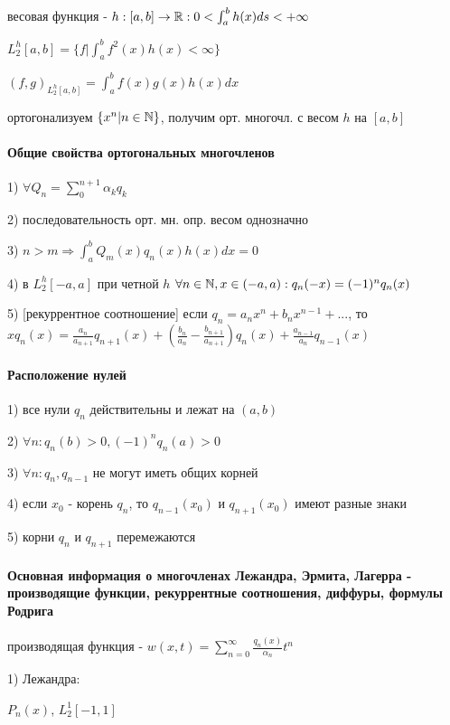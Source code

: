 \documentclass[russian,twocolumn]{article}
\begin{document}
весовая функция - $h:[a,b]\to \Bbb R : 0 < \int_a^b h(x)ds < +\infty$ 

$L_2^h[a,b]=\{f|\int_a^b f^2(x)h(x) < \infty\}$

$(f,g)_{L_2^h[a,b]}=\int_a^b f(x)g(x)h(x)dx$

ортогонализуем $\{x^n | n \in \Bbb N\}$, получим орт. многочл. с весом $h$ на $[a,b]$

\paragraph{Общие свойства ортогональных многочленов}

1) $\forall Q_n = \sum_0^{n+1} \alpha_k q_k$

2) последовательность орт. мн. опр. весом однозначно

3) $n > m \Rightarrow \int _a^b Q_m(x) q_n(x) h(x) dx = 0$

4) в $L_2^h[-a,a]$ при четной $h$ $\forall n \in \Bbb N,x\in(-a,a):q_n(-x)=(-1)^n q_n(x)$

5) [рекуррентное соотношение] если $q_n = a_n x^n + b_n x^{n-1} + ...$, то $x q_n(x) = \frac{a_n}{a_{n+1}}q_{n+1}(x)+(\frac{b_n}{a_n} - \frac{b_{n+1}}{a_{n+1}}) q_n(x) + \frac{a_{n-1}}{a_n}q_{n-1}(x)$

\paragraph{Расположение нулей}

1) все нули $q_n$ действительны и лежат на $(a,b)$

2) $\forall n : q_n(b) > 0, (-1)^n q_n(a) > 0$

3) $\forall n : q_n, q_{n-1}$ не могут иметь общих корней

4) если $x_0$ - корень $q_n$, то $q_{n-1}(x_0)$ и $q_{n+1}(x_0)$ имеют разные знаки

5) корни $q_n$ и $q_{n+1}$ перемежаются

\paragraph{Основная информация о многочленах Лежандра, Эрмита, Лагерра - производящие функции, рекуррентные соотношения, диффуры, формулы Родрига}

производящая функция - $w(x,t)=\sum _{n=0} ^ {\infty} \frac{q_n(x)}{\alpha_n}t^n$

1) Лежандра: 

$P_n(x)$, $L_2^1[-1,1]$
\end{document}
